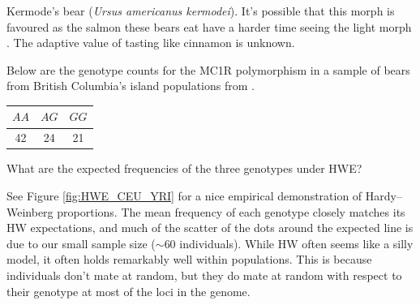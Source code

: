 {{\begin{question}
\begin{marginfigure}
\begin{center}
\end{center}
\caption{Kermode's bear (\textit{Ursus americanus kermodei}). It's
  possible that this morph is favoured as the salmon these bears eat have a harder time
  seeing the light morph \citep{klinka2009adaptive}. The adaptive
  value of tasting like cinnamon is unknown.  } \label{fig:Kermodes_bear}
\end{marginfigure}

Below are the genotype counts for the MC1R polymorphism in a
sample of bears from British Columbia's island populations from \citet{RITLAND:01}.
\begin{center}
\begin{tabular}{ccc}
\hline
$AA$ & $AG$ & $GG$ \\
\hline
42 & 24 & 21\\
\end{tabular}
\end{center}
What are the expected frequencies of the three genotypes under HWE?
\end{question}


See Figure \ref{fig:HWE_CEU_YRI} for a nice
empirical demonstration of Hardy--Weinberg proportions. The mean
frequency of each genotype
closely matches its HW expectations, and much of the scatter of the
dots around the expected line is due to our small sample size ($\sim
60$ individuals). While HW often
seems like a silly model, it often holds remarkably well within
populations. This is because individuals don't mate at random, but they
do mate at random with respect to their genotype at most of the loci
in the genome.

}}
